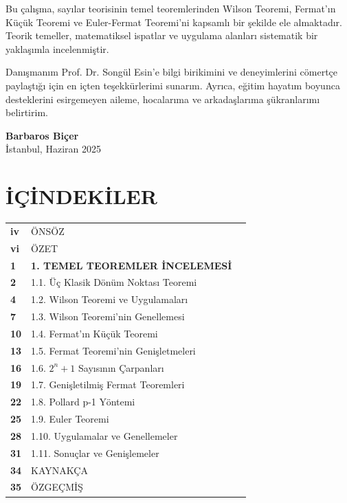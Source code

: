 \documentclass[a4paper,12pt]{article}
\begin{document}
Bu çalışma, sayılar teorisinin temel teoremlerinden Wilson Teoremi, Fermat'ın Küçük Teoremi ve Euler-Fermat Teoremi'ni kapsamlı bir şekilde ele almaktadır. Teorik temeller, matematiksel ispatlar ve uygulama alanları sistematik bir yaklaşımla incelenmiştir.

Danışmanım Prof. Dr. Songül Esin'e bilgi birikimini ve deneyimlerini cömertçe paylaştığı için en içten teşekkürlerimi sunarım. Ayrıca, eğitim hayatım boyunca desteklerini esirgemeyen aileme, hocalarıma ve arkadaşlarıma şükranlarımı belirtirim.

\vspace{1cm}
\hfill \textbf{Barbaros Biçer} \\
\hfill İstanbul, Haziran 2025

\clearpage
\section*{İÇİNDEKİLER}

\begin{tabular}{@{}p{1cm}p{12cm}p{1cm}@{}}
    \textbf{iv} & ÖNSÖZ & \\
    \textbf{vi} & ÖZET & \\
    \textbf{1} & \textbf{1. TEMEL TEOREMLER İNCELEMESİ} & \\
    \textbf{2} & \hspace{0.5cm}1.1. Üç Klasik Dönüm Noktası Teoremi & \\
    \textbf{4} & \hspace{0.5cm}1.2. Wilson Teoremi ve Uygulamaları & \\
    \textbf{7} & \hspace{0.5cm}1.3. Wilson Teoremi'nin Genellemesi & \\
    \textbf{10} & \hspace{0.5cm}1.4. Fermat'ın Küçük Teoremi & \\
    \textbf{13} & \hspace{0.5cm}1.5. Fermat Teoremi'nin Genişletmeleri & \\
    \textbf{16} & \hspace{0.5cm}1.6. $2^n + 1$ Sayısının Çarpanları & \\
    \textbf{19} & \hspace{0.5cm}1.7. Genişletilmiş Fermat Teoremleri & \\
    \textbf{22} & \hspace{0.5cm}1.8. Pollard p-1 Yöntemi & \\
    \textbf{25} & \hspace{0.5cm}1.9. Euler Teoremi & \\
    \textbf{28} & \hspace{0.5cm}1.10. Uygulamalar ve Genellemeler & \\
    \textbf{31} & \hspace{0.5cm}1.11. Sonuçlar ve Genişlemeler & \\
    \textbf{34} & KAYNAKÇA & \\
    \textbf{35} & ÖZGEÇMİŞ & \\
\end{tabular}
\end{document}
